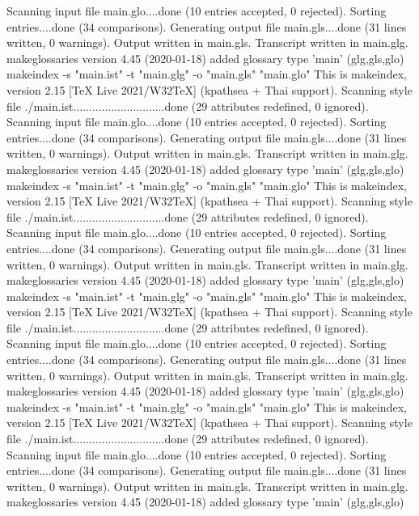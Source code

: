 Scanning input file main.glo....done (10 entries accepted, 0 rejected).
Sorting entries....done (34 comparisons).
Generating output file main.gls....done (31 lines written, 0 warnings).
Output written in main.gls.
Transcript written in main.glg.
makeglossaries version 4.45 (2020-01-18)
added glossary type 'main' (glg,gls,glo)
makeindex  -s "main.ist" -t "main.glg" -o "main.gls" "main.glo"
This is makeindex, version 2.15 [TeX Live 2021/W32TeX] (kpathsea + Thai support).
Scanning style file ./main.ist.............................done (29 attributes redefined, 0 ignored).
Scanning input file main.glo....done (10 entries accepted, 0 rejected).
Sorting entries....done (34 comparisons).
Generating output file main.gls....done (31 lines written, 0 warnings).
Output written in main.gls.
Transcript written in main.glg.
makeglossaries version 4.45 (2020-01-18)
added glossary type 'main' (glg,gls,glo)
makeindex  -s "main.ist" -t "main.glg" -o "main.gls" "main.glo"
This is makeindex, version 2.15 [TeX Live 2021/W32TeX] (kpathsea + Thai support).
Scanning style file ./main.ist.............................done (29 attributes redefined, 0 ignored).
Scanning input file main.glo....done (10 entries accepted, 0 rejected).
Sorting entries....done (34 comparisons).
Generating output file main.gls....done (31 lines written, 0 warnings).
Output written in main.gls.
Transcript written in main.glg.
makeglossaries version 4.45 (2020-01-18)
added glossary type 'main' (glg,gls,glo)
makeindex  -s "main.ist" -t "main.glg" -o "main.gls" "main.glo"
This is makeindex, version 2.15 [TeX Live 2021/W32TeX] (kpathsea + Thai support).
Scanning style file ./main.ist.............................done (29 attributes redefined, 0 ignored).
Scanning input file main.glo....done (10 entries accepted, 0 rejected).
Sorting entries....done (34 comparisons).
Generating output file main.gls....done (31 lines written, 0 warnings).
Output written in main.gls.
Transcript written in main.glg.
makeglossaries version 4.45 (2020-01-18)
added glossary type 'main' (glg,gls,glo)
makeindex  -s "main.ist" -t "main.glg" -o "main.gls" "main.glo"
This is makeindex, version 2.15 [TeX Live 2021/W32TeX] (kpathsea + Thai support).
Scanning style file ./main.ist.............................done (29 attributes redefined, 0 ignored).
Scanning input file main.glo....done (10 entries accepted, 0 rejected).
Sorting entries....done (34 comparisons).
Generating output file main.gls....done (31 lines written, 0 warnings).
Output written in main.gls.
Transcript written in main.glg.
makeglossaries version 4.45 (2020-01-18)
added glossary type 'main' (glg,gls,glo)
